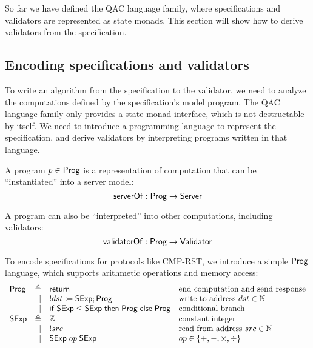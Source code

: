 So far we have defined the QAC language family, where specifications and
validators are represented as state monads.  This section will show how to
derive validators from the specification.

\subsection{Encoding specifications and validators}
To write an algorithm from the specification to the validator, we need to
analyze the computations defined by the specification's model program.  The QAC
language family only provides a state monad interface, which is not destructable
by itself.  We need to introduce a programming language to represent the
specification, and derive validators by interpreting programs written in that
language.

\begin{definition}
  A program $p\in\mathsf{Prog}$ is a representation of computation that can be
  ``instantiated'' into a server model:
  \[\mathsf{serverOf}:\mathsf{Prog}\to\mathsf{Server}\]
  
  A program can also be ``interpreted'' into other computations, including
  validators:
  \[\mathsf{validatorOf}:\mathsf{Prog}\to\mathsf{Validator}\]
\end{definition}
To encode specifications for protocols like CMP-RST, we introduce a simple
$\mathsf{Prog}$ language, which supports arithmetic operations and memory access:
\[\begin{array}{lrll}
\Prog&\triangleq&\Return&\text{end computation and send response}\\
&\mid&!dst\coloneqq\Sexp;\Prog&\text{write to address }dst\in\Nat\\\null
&\mid&\If\Sexp\le\Sexp\Then\Prog\Else\Prog&\text{conditional branch}\\
\Sexp&\triangleq&\Int&\text{constant integer}\\
&\mid&!src&\text{read from address }src\in\Nat\\
&\mid&\Sexp\;op\;\Sexp&op\in\{+,-,\times,\div\}
\end{array}
\]

